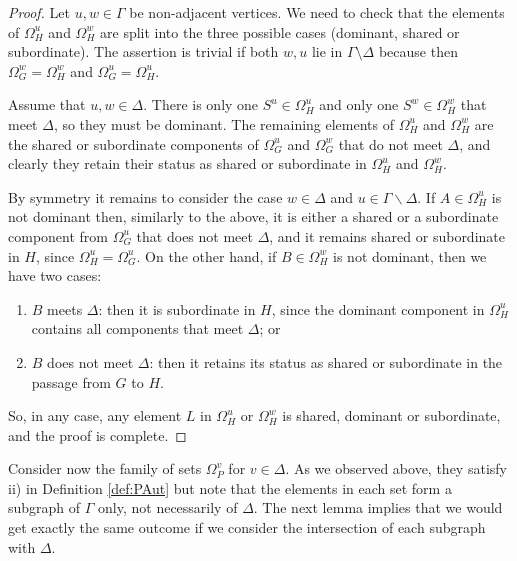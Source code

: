 \documentclass[10pt]{amsart}
\theoremstyle{definition}
\theoremstyle{definition}
\numberwithin{equation}{section}
\begin{document}
\begin{proof} Let $u,w\in\Gamma$ be non-adjacent vertices. We need to check that the elements of $\Omega_H^u$ and $\Omega_H^w$ are split into the three possible cases (dominant, shared or subordinate). The assertion is trivial if both $w,u$ lie in $\Gamma\setminus\Delta$ because then $\Omega^w_G=\Omega^w_H$ and $\Omega^u_G=\Omega^u_H$.

Assume that $u,w\in\Delta$. There is only one $S^u\in\Omega_H^u$ and only one $S^w\in\Omega_H^w$ that meet $\Delta$, so they must be dominant. The remaining elements of $\Omega_H^u$ and $\Omega_H^w$ are the shared or subordinate components of $\Omega_G^u$ and $\Omega_G^w$ that do not meet $\Delta$, and clearly they retain their status as shared or  subordinate  in $\Omega_H^u$ and $\Omega_H^w$.

By symmetry it remains to consider the case $w \in \Delta$ and $u \in \Gamma \smallsetminus \Delta$. If  $A \in \Omega_H^u$ is not dominant then, similarly to the above, it is either a shared or a subordinate component from $\Omega_G^u$ that does not meet $\Delta$, and it remains shared or subordinate in $H$, since $\Omega_H^u = \Omega_G^u$. On the other hand, if $B \in \Omega_H^w$ is not dominant, then we have two cases:
\begin{enumerate}
 \item $B$ meets $\Delta$: then it is subordinate in $H$, since the dominant component in $\Omega_H^u$ contains all components that meet $\Delta$; or
 \item $B$ does not meet $\Delta$: then it retains its status as shared or subordinate  in the passage from $G$ to $H$.
\end{enumerate}

So, in any case, any element $L$ in $\Omega_H^u$ or $\Omega_H^w$ is shared, dominant or subordinate, and the proof is complete.
\end{proof}




Consider now the family of sets $\Omega^v_P$ for $v\in\Delta$. As we observed above, they satisfy ii) in Definition \ref{def:PAut} but note that the elements in each set  form a subgraph of $\Gamma$  only, not necessarily of $\Delta$. The next lemma implies that we would get exactly the same outcome if we consider the intersection of each subgraph with $\Delta$.
\end{document}
